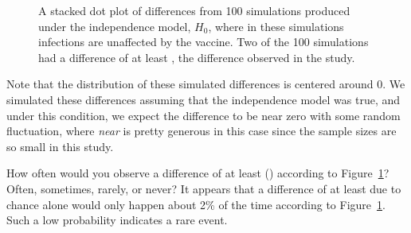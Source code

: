 \begin{figure}[ht]
  \centering
  \caption{A stacked dot plot of differences from
      100 simulations produced under the independence model,
      $H_0$, where in these simulations infections are
      unaffected by the vaccine.
      Two of the 100 simulations had a difference of
      at least \malariaIRDiffPerc{}, the difference observed
      in the study.}
  \label{malaria_rand_dot_plot}
\end{figure}

Note that the distribution of these simulated differences
is centered around 0.
We simulated these differences assuming that the independence
model was true, and under this condition,
we expect the difference to be near zero with some random
fluctuation, where \emph{near} is pretty generous in this
case since the sample sizes are so small in this study.

\begin{example}{How often would you observe a difference
    of at least \malariaIRDiffPerc{} (\malariaIRDiff{})
    according to Figure~\ref{malaria_rand_dot_plot}?
    Often, sometimes, rarely, or never?}
  It appears that a difference of at least
  \malariaIRDiffPerc{} due to chance alone would only
  happen about 2\% of the time according to
  Figure~\ref{malaria_rand_dot_plot}.
  Such a low probability indicates a rare event.
\end{example}

